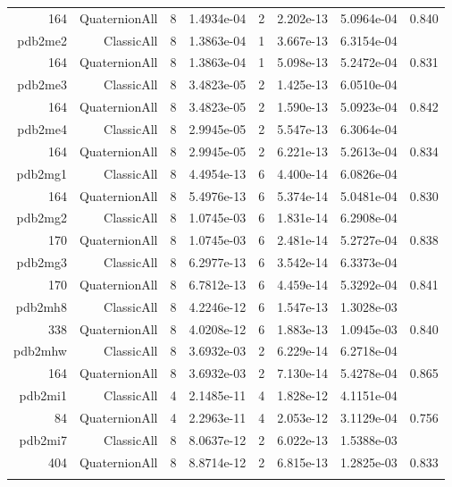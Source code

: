 \begin{xltabular}{\textwidth}{r|rcS[table-format=1.4e+2]cS[table-format=1.3e+2]S[table-format=1.4e+2]S[table-format=-1.3]}
164 & QuaternionAll & 8 & 1.4934e-04 & 2 & 2.202e-13 & 5.0964e-04 & 0.840\\  \addlinespace
pdb2me2 & ClassicAll & 8 & 1.3863e-04 & 1 & 3.667e-13 & 6.3154e-04 & \\
164 & QuaternionAll & 8 & 1.3863e-04 & 1 & 5.098e-13 & 5.2472e-04 & 0.831\\  \addlinespace
pdb2me3 & ClassicAll & 8 & 3.4823e-05 & 2 & 1.425e-13 & 6.0510e-04 & \\
164 & QuaternionAll & 8 & 3.4823e-05 & 2 & 1.590e-13 & 5.0923e-04 & 0.842\\  \addlinespace
pdb2me4 & ClassicAll & 8 & 2.9945e-05 & 2 & 5.547e-13 & 6.3064e-04 & \\
164 & QuaternionAll & 8 & 2.9945e-05 & 2 & 6.221e-13 & 5.2613e-04 & 0.834\\  \addlinespace
pdb2mg1 & ClassicAll & 8 & 4.4954e-13 & 6 & 4.400e-14 & 6.0826e-04 & \\
164 & QuaternionAll & 8 & 5.4976e-13 & 6 & 5.374e-14 & 5.0481e-04 & 0.830\\  \addlinespace
pdb2mg2 & ClassicAll & 8 & 1.0745e-03 & 6 & 1.831e-14 & 6.2908e-04 & \\
170 & QuaternionAll & 8 & 1.0745e-03 & 6 & 2.481e-14 & 5.2727e-04 & 0.838\\  \addlinespace
pdb2mg3 & ClassicAll & 8 & 6.2977e-13 & 6 & 3.542e-14 & 6.3373e-04 & \\
170 & QuaternionAll & 8 & 6.7812e-13 & 6 & 4.459e-14 & 5.3292e-04 & 0.841\\  \addlinespace
pdb2mh8 & ClassicAll & 8 & 4.2246e-12 & 6 & 1.547e-13 & 1.3028e-03 & \\
338 & QuaternionAll & 8 & 4.0208e-12 & 6 & 1.883e-13 & 1.0945e-03 & 0.840\\  \addlinespace
pdb2mhw & ClassicAll & 8 & 3.6932e-03 & 2 & 6.229e-14 & 6.2718e-04 & \\
164 & QuaternionAll & 8 & 3.6932e-03 & 2 & 7.130e-14 & 5.4278e-04 & 0.865\\  \addlinespace
pdb2mi1 & ClassicAll & 4 & 2.1485e-11 & 4 & 1.828e-12 & 4.1151e-04 & \\
84 & QuaternionAll & 4 & 2.2963e-11 & 4 & 2.053e-12 & 3.1129e-04 & 0.756\\  \addlinespace
pdb2mi7 & ClassicAll & 8 & 8.0637e-12 & 2 & 6.022e-13 & 1.5388e-03 & \\
404 & QuaternionAll & 8 & 8.8714e-12 & 2 & 6.815e-13 & 1.2825e-03 & 0.833\\  \addlinespace

\end{xltabular}
